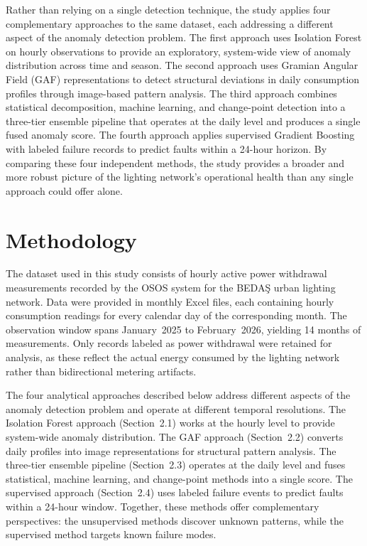 \documentclass{article}
\begin{document}
Rather than relying on a single detection technique, the study applies four complementary approaches to the same dataset, each addressing a different aspect of the anomaly detection problem. The first approach uses Isolation Forest on hourly observations to provide an exploratory, system-wide view of anomaly distribution across time and season. The second approach uses Gramian Angular Field (GAF) representations to detect structural deviations in daily consumption profiles through image-based pattern analysis. The third approach combines statistical decomposition, machine learning, and change-point detection into a three-tier ensemble pipeline that operates at the daily level and produces a single fused anomaly score. The fourth approach applies supervised Gradient Boosting with labeled failure records to predict faults within a 24-hour horizon. By comparing these four independent methods, the study provides a broader and more robust picture of the lighting network's operational health than any single approach could offer alone.

\section{Methodology}

The dataset used in this study consists of hourly active power withdrawal measurements recorded by the OSOS system for the BEDA\c{S} urban lighting network. Data were provided in monthly Excel files, each containing hourly consumption readings for every calendar day of the corresponding month. The observation window spans January~2025 to February~2026, yielding 14 months of measurements. Only records labeled as power withdrawal were retained for analysis, as these reflect the actual energy consumed by the lighting network rather than bidirectional metering artifacts.

The four analytical approaches described below address different aspects of the anomaly detection problem and operate at different temporal resolutions. The Isolation Forest approach (Section~2.1) works at the hourly level to provide system-wide anomaly distribution. The GAF approach (Section~2.2) converts daily profiles into image representations for structural pattern analysis. The three-tier ensemble pipeline (Section~2.3) operates at the daily level and fuses statistical, machine learning, and change-point methods into a single score. The supervised approach (Section~2.4) uses labeled failure events to predict faults within a 24-hour window. Together, these methods offer complementary perspectives: the unsupervised methods discover unknown patterns, while the supervised method targets known failure modes.
\end{document}
